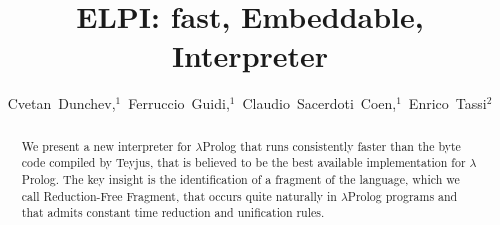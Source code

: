 \documentclass{llncs}
\begin{document}
\title{ELPI: fast, Embeddable, \lp{} Interpreter}





\author{Cvetan~Dunchev,$^1$~Ferruccio~Guidi,$^1$~Claudio~Sacerdoti~Coen,$^1$~Enrico~Tassi$^2$}






\newcommand{\frag}{Reduction-Free Fragment}
\newcommand{\lp}{$\lambda$Prolog}
\newcommand{\Ll}{\ensuremath{\mathcal{L}_\lambda}}
\newcommand{\elpi}{ELPI}
\newcommand{\tedius}{Teyjus}
\newcommand{\CSC}[1]{\textcolor{red}{#1}}
\newcommand{\FG}[1]{\textcolor{magenta}{#1}}

\maketitle

\begin{abstract}
We present a new interpreter for \lp{} that runs consistently faster than
the byte code compiled by \tedius{}, that is believed to be the best
available implementation for \lp. 
The key insight is the identification of a fragment of
the language, which we call \frag{}, that occurs quite naturally in \lp{}
programs and that admits constant time reduction and unification rules.
\end{abstract}
\end{document}
